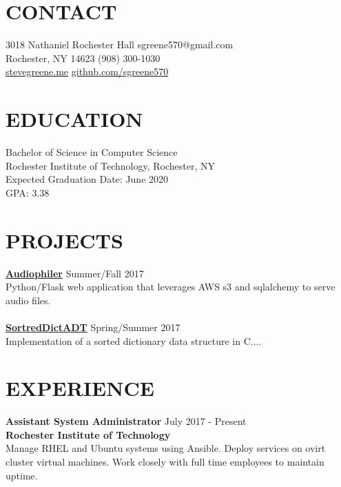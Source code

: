 \documentclass[line, margin]{res}
\begin{document}

\begin{resume}

\section {CONTACT}
3018 Nathaniel Rochester Hall \hfill sgreene570@gmail.com \\
Rochester, NY 14623 \hfill (908) 300-1030 \\
\url{stevegreene.me} \hfill \url{github.com/sgreene570}

\section{EDUCATION}
Bachelor of Science in Computer Science \\
Rochester Institute of Technology, Rochester, NY \\
Expected Graduation Date: June 2020 \\
GPA: 3.38

\section{PROJECTS}
{\bf \href{github.com/sgreene570/audiophiler}{Audiophiler}} \hfill Summer/Fall 2017 \\
Python/Flask web application that leverages AWS s3 and sqlalchemy to serve audio
files.
\\
\\
{\bf \href{https://github.com/sgreene570/SortedDictADT}{SortredDictADT}} \hfill Spring/Summer 2017 \\
Implementation of a sorted dictionary data structure in C....\\

\section{EXPERIENCE}
{\bf \large{Assistant System Administrator}} \hfill July 2017 - Present \\
{\bf Rochester Institute of Technology} \\
Manage RHEL and Ubuntu systems using Ansible.  Deploy services on ovirt cluster virtual machines.  Work closely with full
time employees to maintain uptime. \\


\end{resume}
\end{document}

